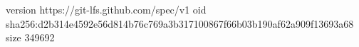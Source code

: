 version https://git-lfs.github.com/spec/v1
oid sha256:d2b314e4592e56d814b76c769a3b317100867f66b03b190af62a909f13693a68
size 349692

